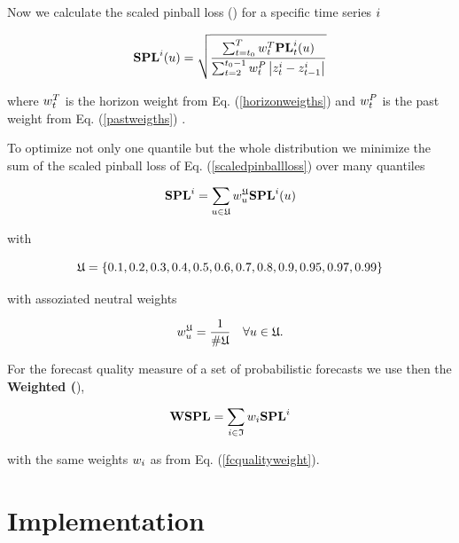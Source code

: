 \documentclass[11pt,headings=small]{scrartcl}
\begin{document}
Now we calculate the scaled pinball loss (\SPL) for a specific time series $i$

\begin{equation}\label{scaledpinballloss}
\textbf{SPL}^{i}(u) = \sqrt{\frac{ \sum_{t=t_{0}}^{T} w^T_t \textbf{PL}^{i}_{t}(u) }{\sum_{t=2}^{t_{0} - 1}w^P_t\left|z^{i}_{t} - z^{i}_{t-1} \right|}}
\end{equation}

where $w^T_t$ is the horizon weight from Eq. (\ref{horizonweigths}) and $w^P_t$ is the past weight from Eq. (\ref{pastweigths}) .

To optimize not only one quantile but the whole distribution we minimize the sum of the scaled pinball loss of Eq. (\ref{scaledpinballloss}) over many quantiles

\begin{equation}\label{scaledpinballlossquantiles}
\textbf{SPL}^{i}=\sum_{u\in\mathfrak{U}}w^{\mathfrak{U}}_u\textbf{SPL}^{i}(u)
\end{equation}

with 

\begin{equation}\label{quantiles}
\mathfrak{U}=\{0.1, 0.2, 0.3, 0.4, 0.5, 0.6, 0.7, 0.8, 0.9, 0.95, 0.97, 0.99\}
\end{equation}

with assoziated neutral weights 

\begin{equation}\label{quantileweigths}
w^{\mathfrak{U}}_u=\frac{1}{\#\mathfrak{U}} \quad \forall u\in\mathfrak{U}.
\end{equation}

For the  forecast quality measure of a set of probabilistic forecasts we use then the  \textbf{Weighted \SPL (\WSPL}),

\begin{equation}\label{scaledpinballlossquantiles}
\textbf{WSPL} = \sum_{i\in\frak{I}} w_{i} \textbf{SPL}^{i} 
\end{equation}

with the same weights $w_{i}$ as from Eq. (\ref{fcqualityweight}).



\section{Implementation}
\label{section:Impl}
\end{document}
